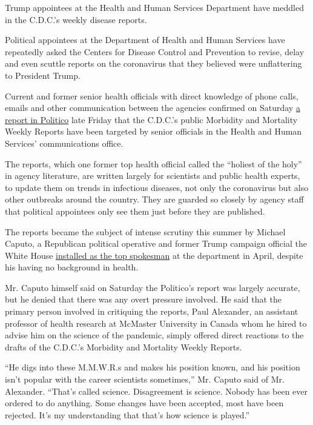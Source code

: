 Trump appointees at the Health and Human Services Department have
meddled in the C.D.C.'s weekly disease reports.

Political appointees at the Department of Health and Human Services have
repeatedly asked the Centers for Disease Control and Prevention to
revise, delay and even scuttle reports on the coronavirus that they
believed were unflattering to President Trump.

Current and former senior health officials with direct knowledge of
phone calls, emails and other communication between the agencies
confirmed on Saturday
\href{https://www.politico.com/news/2020/09/11/exclusive-trump-officials-interfered-with-cdc-reports-on-covid-19-412809}{a
report in Politico} late Friday that the C.D.C.'s public Morbidity and
Mortality Weekly Reports have been targeted by senior officials in the
Health and Human Services' communications office.

The reports, which one former top health official called the ``holiest
of the holy'' in agency literature, are written largely for scientists
and public health experts, to update them on trends in infectious
diseases, not only the coronavirus but also other outbreaks around the
country. They are guarded so closely by agency staff that political
appointees only see them just before they are published.

The reports became the subject of intense scrutiny this summer by
Michael Caputo, a Republican political operative and former Trump
campaign official the White House
\href{https://www.nytimes3xbfgragh.onion/2020/04/16/us/politics/michael-caputo-hhs.html}{installed
as the top spokesman} at the department in April, despite his having no
background in health.

Mr. Caputo himself said on Saturday the Politico's report was largely
accurate, but he denied that there was any overt pressure involved. He
said that the primary person involved in critiquing the reports, Paul
Alexander, an assistant professor of health research at McMaster
University in Canada whom he hired to advise him on the science of the
pandemic, simply offered direct reactions to the drafts of the C.D.C.'s
Morbidity and Mortality Weekly Reports.

``He digs into these M.M.W.R.s and makes his position known, and his
position isn't popular with the career scientists sometimes,'' Mr.
Caputo said of Mr. Alexander. ``That's called science. Disagreement is
science. Nobody has been ever ordered to do anything. Some changes have
been accepted, most have been rejected. It's my understanding that
that's how science is played.''

